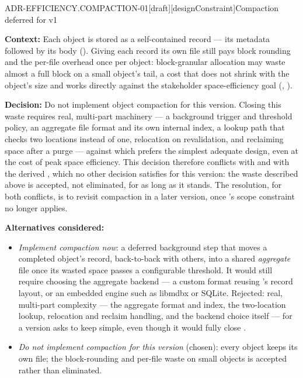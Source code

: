 \begin{requirement}{ADR-EFFICIENCY.COMPACTION-01}[draft][designConstraint]{Compaction deferred for v1}


  \textbf{Context:} Each object is stored as a self-contained record --- its
  metadata followed by its body (). Giving each
  record its own file still pays block rounding and the per-file overhead once
  per object: block-granular allocation may waste almost a full block on a
  small object's tail, a cost that does not shrink with the object's size and
  works directly against the stakeholder space-efficiency goal
  (, ).

  \textbf{Decision:} Do not implement object compaction for this version.
  Closing this waste requires real, multi-part machinery --- a background
  trigger and threshold policy, an aggregate file format and its own
  internal index, a lookup path that checks two locations instead of one,
  relocation on revalidation, and reclaiming space after a purge --- against
  which  prefers the simplest adequate design, even
  at the cost of peak space efficiency. This decision therefore conflicts
  with  and with the derived
  , which no other decision
  satisfies for this version: the waste described above is accepted, not
  eliminated, for as long as it stands. The resolution, for both conflicts,
  is to revisit compaction in a later version, once
  's scope constraint no longer applies.

  \textbf{Alternatives considered:}
  \begin{itemize}
    \item \emph{Implement compaction now}: a deferred background step that
      moves a completed object's record, back-to-back with others, into a
      shared \emph{aggregate} file once its wasted space passes a
      configurable threshold. It would still require choosing the aggregate
      backend --- a custom format reusing
      's record layout, or an embedded
      engine such as libmdbx or SQLite. Rejected: real,
      multi-part complexity --- the aggregate format and index, the
      two-location lookup, relocation and reclaim handling, and the
      backend choice itself --- for a version 
      asks to keep simple, even though it would fully close
      .
    \item \emph{Do not implement compaction for this version} (chosen):
      every object keeps its own file; the block-rounding and per-file
      waste on small objects is accepted rather than eliminated.
  \end{itemize}


\end{requirement}
